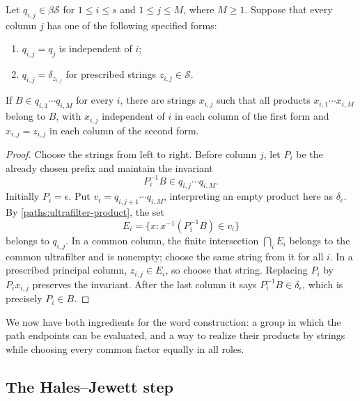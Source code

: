 \begin{lemma}\label{paths:realization}
Let $q_{i,j}\in\beta\mathcal S$ for $1\le i\le s$ and
$1\le j\le M$, where $M\ge1$. Suppose that every column $j$ has
one of the following specified forms:
\begin{enumerate}
\item $q_{i,j}=q_j$ is independent of $i$;
\item $q_{i,j}=\delta_{z_{i,j}}$ for prescribed strings
      $z_{i,j}\in\mathcal S$.
\end{enumerate}
If $B\in q_{i,1}\cdots q_{i,M}$ for every $i$, there are strings
$x_{i,j}$ such that all products $x_{i,1}\cdots x_{i,M}$ belong to
$B$, with $x_{i,j}$ independent of $i$ in each column of the first
form and $x_{i,j}=z_{i,j}$ in each column of the second form.
\end{lemma}

\begin{proof}
Choose the strings from left to right. Before column $j$, let $P_i$
be the already chosen prefix and maintain the invariant
\[
P_i^{-1}B\in q_{i,j}\cdots q_{i,M}.
\]
Initially $P_i=\epsilon$. Put
$v_i=q_{i,j+1}\cdots q_{i,M}$, interpreting an empty product here
as $\delta_\epsilon$. By
\eqref{paths:ultrafilter-product}, the set
\[
E_i=\{x:x^{-1}(P_i^{-1}B)\in v_i\}
\]
belongs to $q_{i,j}$. In a common column, the finite intersection
$\bigcap_i E_i$ belongs to the common ultrafilter and is nonempty;
choose the same string from it for all $i$. In a prescribed principal
column, $z_{i,j}\in E_i$, so choose that string. Replacing $P_i$ by
$P_ix_{i,j}$ preserves the invariant. After the last column it says
$P_i^{-1}B\in\delta_\epsilon$, which is precisely $P_i\in B$.
\end{proof}

We now have both ingredients for the word construction: a group in
which the path endpoints can be evaluated, and a way to realize
their products by strings while choosing every common factor equally
in all roles.

\subsection{The Hales--Jewett step}

